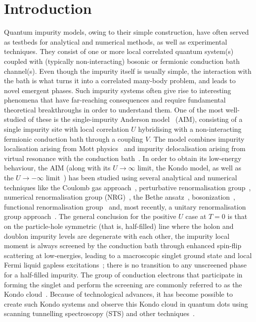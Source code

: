 \documentclass[reprint,superscriptaddress,floatfix]{revtex4-2}
\begin{document}
\section{Introduction}

Quantum impurity models, owing to their simple construction, have often served as testbeds for analytical and numerical methods, as well as experimental techniques.
They consist of one or more local correlated quantum system(s) coupled with (typically non-interacting) bosonic or fermionic conduction bath channel(s).
Even though the impurity itself is usually simple, the interaction with the bath is what turns it into a correlated many-body problem, and leads to novel emergent phases. Such impurity systems often give rise to interesting phenomena that have far-reaching consequences and require fundamental theoretical breakthroughs in order to understand them.
One of the most well-studied of these is the single-impurity Anderson model~\cite{anderson_1961,anderson_1978} (AIM), consisting of a single impurity site with local correlation \(U\) hybridising with a non-interacting fermionic conduction bath through a coupling \(V\).
The model combines impurity localisation arising from Mott physics~\cite{Mott_1949,vanvleck_1953} and impurity delocalisation arising from virtual resonance with the conduction bath~\cite{friedel_1956}.
In order to obtain its low-energy behaviour, the AIM (along with its \(U \to \infty\) limit, the Kondo model, as well as the \(U \to -\infty\) limit~\cite{schrieffer1966,taraphder_1991}) has been studied using several analytical and numerical techniques like the Coulomb gas approach~\cite{anderson1969exact,anderson1970exact}, perturbative renormalisation group~\cite{anderson1970,haldane1978scaling,jefferson_1977}, numerical renormalisation group (NRG)~\cite{wilson1975,hrk_wilson_1980}, the Bethe ansatz~\cite{andrei_1980,andreiKondoreview,Wiegmann_1981,tsvelickKondoreview}, bosonization~\cite{kotliar_1996,Duki_2011,borda_2008}, functional renormalisation group~\cite{streib_2013} and, most recently, a unitary renormalisation group approach~\cite{anirban_kondo}. 
The general conclusion for the positive \(U\) case at \(T=0\) is that on the particle-hole symmetric (that is, half-filled) line where the holon and doublon impurity levels are degenerate with each other, the impurity local moment is always screened by the conduction bath through enhanced spin-flip scattering at low-energies, leading to a macroscopic singlet ground state and local Fermi liquid gapless excitations~\cite{nozaki2012,mora_2015}; there is no transition to any unscreened phase for a half-filled impurity. The group of conduction electrons that participate in forming the singlet and perform the screening are commonly referred to as the Kondo cloud~\cite{sorensen_erik_affleck_1996,affleck_ian_2001,simon_pascal_2003,martin2010,martin2019}. Because of technological advances, it has become possible to create such Kondo systems and observe this Kondo cloud in quantum dots using scanning tunnelling spectroscopy (STS) and other techniques~\cite{Goldhaber-Gordon1998,Cronenwett1998,Schmid_Weis1998,pustilnik_glazman_2004,Borzenets2020,neel_berndt_2008,Zhao2005}.
\end{document}
